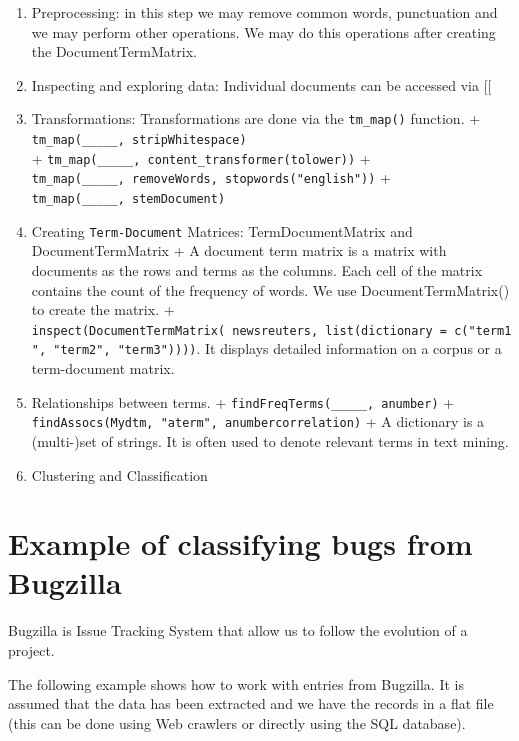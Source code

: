 \documentclass[
]{book}
\begin{document}
\begin{enumerate}
\def\labelenumi{\arabic{enumi}.}
\setcounter{enumi}{1}
\item
  Preprocessing: in this step we may remove common words, punctuation and we may perform other operations. We may do this operations after creating the DocumentTermMatrix.
\item
  Inspecting and exploring data: Individual documents can be accessed via {[}{[}
\item
  Transformations: Transformations are done via the \texttt{tm\_map()} function.
  + \texttt{tm\_map(\_\_\_\_\_,\ stripWhitespace)}\\
  + \texttt{tm\_map(\_\_\_\_\_,\ content\_transformer(tolower))}
  + \texttt{tm\_map(\_\_\_\_\_,\ removeWords,\ stopwords("english"))}
  + \texttt{tm\_map(\_\_\_\_\_,\ stemDocument)}
\item
  Creating \texttt{Term-Document} Matrices: TermDocumentMatrix and DocumentTermMatrix
  + A document term matrix is a matrix with documents as the rows and terms as the columns. Each cell of the matrix contains the count of the frequency of words. We use DocumentTermMatrix()
  to create the matrix.
  + \texttt{inspect(DocumentTermMatrix(\ newsreuters,\ list(dictionary\ =\ c("term1",\ "term2",\ "term3"))))}. It displays detailed information on a corpus or a term-document matrix.
\item
  Relationships between terms.
  + \texttt{findFreqTerms(\_\_\_\_\_,\ anumber)}
  + \texttt{findAssocs(Mydtm,\ "aterm",\ anumbercorrelation)}
  + A dictionary is a (multi-)set of strings. It is often used to denote relevant terms in text mining.
\item
  Clustering and Classification
\end{enumerate}

\hypertarget{example-of-classifying-bugs-from-bugzilla}{%
\section{Example of classifying bugs from Bugzilla}\label{example-of-classifying-bugs-from-bugzilla}}

Bugzilla is Issue Tracking System that allow us to follow the evolution of a project.

The following example shows how to work with entries from Bugzilla. It is assumed that the data has been extracted and we have the records in a flat file (this can be done using Web crawlers or directly using the SQL database).
\end{document}
